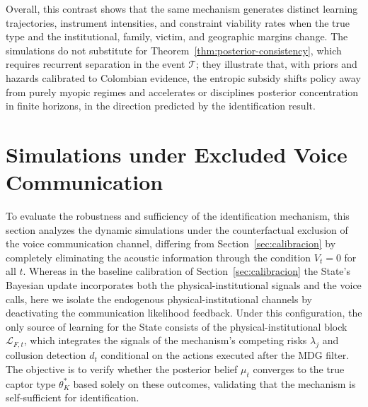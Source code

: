 \documentclass[review,authoryear,12pt]{elsarticle}
\theoremstyle{plain}
\theoremstyle{definition}
\newcommand{\1}{\mathbf{1}}
\begin{document}
Overall, this contrast shows that the same mechanism generates distinct learning trajectories, instrument intensities, and constraint viability rates when the true type and the institutional, family, victim, and geographic margins change. The simulations do not substitute for Theorem~\ref{thm:posterior-consistency}, which requires recurrent separation in the event $\mathcal{T}$; they illustrate that, with priors and hazards calibrated to Colombian evidence, the entropic subsidy shifts policy away from purely myopic regimes and accelerates or disciplines posterior concentration in finite horizons, in the direction predicted by the identification result.

\section{Simulations under Excluded Voice Communication}\label{sec:no-voice}

To evaluate the robustness and sufficiency of the identification mechanism, this section analyzes the dynamic simulations under the counterfactual exclusion of the voice communication channel, differing from Section~\ref{sec:calibracion} by completely eliminating the acoustic information through the condition $V_t = 0$ for all $t$. Whereas in the baseline calibration of Section~\ref{sec:calibracion} the State's Bayesian update incorporates both the physical-institutional signals and the voice calls, here we isolate the endogenous physical-institutional channels by deactivating the communication likelihood feedback. Under this configuration, the only source of learning for the State consists of the physical-institutional block $\mathcal{L}_{F,t}$, which integrates the signals of the mechanism's competing risks $\lambda_j$ and collusion detection $d_t$ conditional on the actions executed after the MDG filter. The objective is to verify whether the posterior belief $\mu_t$ converges to the true captor type $\theta_K^\ast$ based solely on these outcomes, validating that the mechanism is self-sufficient for identification.
\end{document}

